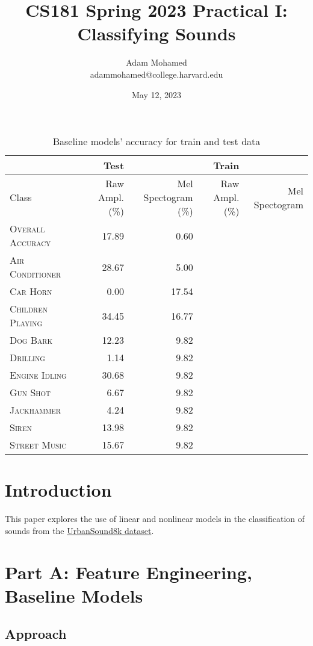 \documentclass[11pt]{article}
\title{CS181 Spring 2023 Practical I: Classifying Sounds}
\author{Adam Mohamed \\ adammohamed@college.harvard.edu}
\date{May 12, 2023}
\begin{document}
\maketitle{}

\begin{table}
\centering
\begin{tabular}{llrrrr}
  &  & Test &   & Train &\\
 \toprule
 Class &  & Raw Ampl. (\%) & Mel Spectogram (\%) & Raw Ampl. (\%) & Mel Spectogram\\
 \midrule
 \textsc{Overall Accuracy} & & 17.89 & 0.60\\
 \textsc{Air Conditioner} & & 28.67 & 5.00  \\
 \textsc{Car Horn} & & 0.00 & 17.54  \\
 \textsc{Children Playing} & & 34.45 & 16.77 \\
 \textsc{Dog Bark} & & 12.23 & 9.82 \\
 \textsc{Drilling} & & 1.14 & 9.82 \\
 \textsc{Engine Idling} & & 30.68 & 9.82 \\
 \textsc{Gun Shot} & & 6.67 & 9.82 \\
 \textsc{Jackhammer} & & 4.24 & 9.82 \\
 \textsc{Siren} & & 13.98 & 9.82 \\
 \textsc{Street Music} & & 15.67 & 9.82 \\
 \bottomrule
\end{tabular}

\caption{\label{tab:results} Baseline models' accuracy for train and test data}
\end{table}


\section{Introduction}
This paper explores the use of linear and nonlinear models in the classification of sounds from the \href{https://urbansounddataset.weebly.com/urbansound8k.html}{UrbanSound8k dataset}.

\section{Part A: Feature Engineering, Baseline Models}

\subsection{Approach}
\end{document}
